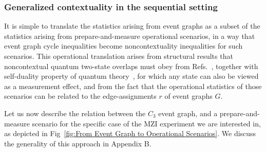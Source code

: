\documentclass[letterpaper,onecolumn,12pt,accepted=2024-01-17]{article}
\begin{document}
\subsubsection{Generalized contextuality in the sequential setting}\label{subsubsec: gen contextuality in sequential}

It is simple to translate the statistics arising from event graphs as a subset of the statistics arising from prepare-and-measure operational scenarios, in a way that event graph cycle inequalities become noncontextuality inequalities for such scenarios. This operational translation arises from structural results that noncontextual quantum two-state overlaps must obey from Refs.~\cite{Lostaglio2020contextualadvantage,schmid2018discrimination}, together with self-duality property of quantum theory~\cite{janotta2013generalized,muller2012structure}, for which any state can also be viewed as a measurement effect, and from the fact that the operational statistics of those scenarios can be related to the edge-assignments $r$ of event graphs $G$. 

Let us now describe the relation between the $C_3$ event graph, and a prepare-and-measure scenario for the specific case of the MZI experiment we are interested in, as depicted in Fig~\ref{fig:From Event Graph to Operational Scenarios}. We discuss the generality of this approach in Appendix B. 

\end{document}

